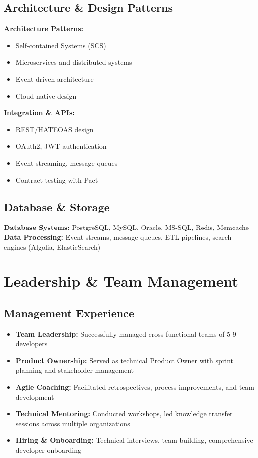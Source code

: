 \documentclass[11pt,a4paper]{article}
\begin{document}
\subsection{Architecture \& Design Patterns}
\begin{multicols}{2}
\textbf{Architecture Patterns:}
\begin{itemize}
    \item Self-contained Systems (SCS)
    \item Microservices and distributed systems
    \item Event-driven architecture
    \item Cloud-native design
\end{itemize}

\textbf{Integration \& APIs:}
\begin{itemize}
    \item REST/HATEOAS design
    \item OAuth2, JWT authentication
    \item Event streaming, message queues
    \item Contract testing with Pact
\end{itemize}
\end{multicols}

\subsection{Database \& Storage}
\textbf{Database Systems:} PostgreSQL, MySQL, Oracle, MS-SQL, Redis, Memcache
\textbf{Data Processing:} Event streams, message queues, ETL pipelines, search engines (Algolia, ElasticSearch)

\section{Leadership \& Team Management}

\subsection{Management Experience}
\begin{itemize}
    \item \textbf{Team Leadership:} Successfully managed cross-functional teams of 5-9 developers
    \item \textbf{Product Ownership:} Served as technical Product Owner with sprint planning and stakeholder management
    \item \textbf{Agile Coaching:} Facilitated retrospectives, process improvements, and team development
    \item \textbf{Technical Mentoring:} Conducted workshops, led knowledge transfer sessions across multiple organizations
    \item \textbf{Hiring \& Onboarding:} Technical interviews, team building, comprehensive developer onboarding
\end{itemize}
\end{document}
